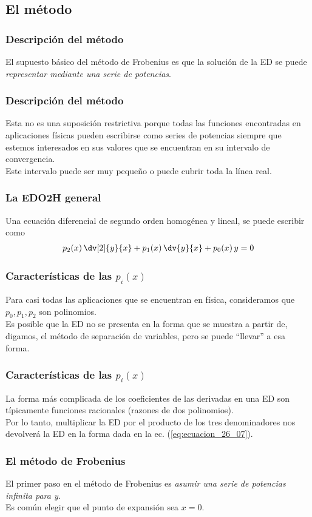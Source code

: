 \subsection{El método}
\begin{frame}
\frametitle{Descripción del método}
El supuesto básico del método de Frobenius es que la solución de la ED se puede \emph{representar mediante una serie de potencias}.
\end{frame}
\begin{frame}
\frametitle{Descripción del método}
Esta no es una suposición restrictiva porque todas las funciones encontradas en aplicaciones físicas pueden escribirse como series de potencias siempre que estemos interesados en sus valores que se encuentran en su intervalo de convergencia.
\\
\bigskip
Este intervalo puede ser muy pequeño o puede cubrir toda la línea real.
\end{frame}
\begin{frame}
\frametitle{La EDO2H general}
Una ecuación diferencial de segundo orden homogénea y lineal, se puede escribir como
\begin{align}
p_{2} (x) \, \dv[2]{y}{x} + p_{1} (x) \, \dv{y}{x} + p_{0}(x) \, y = 0
\label{eq:ecuacion_26_07}    
\end{align}
\end{frame}
\begin{frame}
\frametitle{Características de las $p_{i}(x)$}
Para casi todas las aplicaciones que se encuentran en física, consideramos que $p_{0}, p_{1}, p_{2}$ son polinomios.
\\
\bigskip
Es posible que la ED no se presenta en la forma que se muestra a partir de, digamos, el método de separación de variables, pero se puede \enquote{llevar} a esa forma.
\end{frame}
\begin{frame}
\frametitle{Características de las $p_{i}(x)$}
La forma más complicada de los coeficientes de las derivadas en una ED son típicamente funciones racionales (razones de dos polinomios).
\\
\bigskip
Por lo tanto, multiplicar la ED por el producto de los tres denominadores nos devolverá la ED en la forma dada en la ec. (\ref{eq:ecuacion_26_07}).
\end{frame}
\begin{frame}
\frametitle{El método de Frobenius}
El primer paso en el método de Frobenius es \emph{asumir una serie de potencias infinita para y}.
\\
\bigskip
Es común elegir que el punto de expansión sea $x = 0$.
\end{frame}
